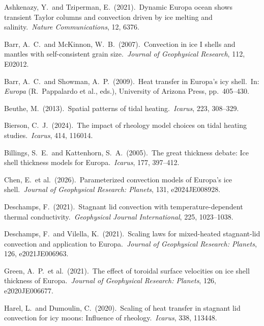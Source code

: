 \documentclass[11pt,letterpaper]{article}
\begin{document}
\begin{enumerate}[label={[\arabic*]},nosep,leftmargin=*]

\item Ashkenazy, Y.\ and Tziperman, E.\ (2021).\ Dynamic Europa ocean shows transient Taylor columns and convection driven by ice melting and salinity.\ \textit{Nature Communications}, 12, 6376.

\item Barr, A.\ C.\ and McKinnon, W.\ B.\ (2007).\ Convection in ice I shells and mantles with self-consistent grain size.\ \textit{Journal of Geophysical Research}, 112, E02012.

\item Barr, A.\ C.\ and Showman, A.\ P.\ (2009).\ Heat transfer in Europa's icy shell.\ In: \textit{Europa} (R.\ Pappalardo et al., eds.), University of Arizona Press, pp.\ 405--430.

\item Beuthe, M.\ (2013).\ Spatial patterns of tidal heating.\ \textit{Icarus}, 223, 308--329.

\item Bierson, C.\ J.\ (2024).\ The impact of rheology model choices on tidal heating studies.\ \textit{Icarus}, 414, 116014.

\item Billings, S.\ E.\ and Kattenhorn, S.\ A.\ (2005).\ The great thickness debate: Ice shell thickness models for Europa.\ \textit{Icarus}, 177, 397--412.

\item Chen, E.\ et al.\ (2026).\ Parameterized convection models of Europa's ice shell.\ \textit{Journal of Geophysical Research: Planets}, 131, e2024JE008928.

\item Deschamps, F.\ (2021).\ Stagnant lid convection with temperature-dependent thermal conductivity.\ \textit{Geophysical Journal International}, 225, 1023--1038.

\item Deschamps, F.\ and Vilella, K.\ (2021).\ Scaling laws for mixed-heated stagnant-lid convection and application to Europa.\ \textit{Journal of Geophysical Research: Planets}, 126, e2021JE006963.

\item Green, A.\ P.\ et al.\ (2021).\ The effect of toroidal surface velocities on ice shell thickness of Europa.\ \textit{Journal of Geophysical Research: Planets}, 126, e2020JE006677.

\item Harel, L.\ and Dumoulin, C.\ (2020).\ Scaling of heat transfer in stagnant lid convection for icy moons: Influence of rheology.\ \textit{Icarus}, 338, 113448.


\end{enumerate}
\end{document}
